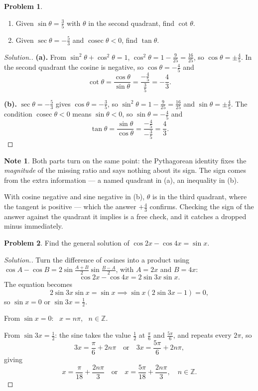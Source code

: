 \documentclass[11pt,a4paper]{article}
\theoremstyle{definition}
\newtheorem{note}[thm]{Note}
\newtheorem{problemx}{Problem}[section]
\newenvironment{problem}{\begin{problemx}}{\end{problemx}}
\newenvironment{solution}
  {\renewcommand{\qedsymbol}{}\begin{proof}[\textit{Solution}.]}
  {\end{proof}}
\begin{document}
\pagebreak

\begin{problem}
\begin{enumerate}
\item[(a).] Given $\sin\theta=\frac{3}{5}$ with $\theta$ in the second quadrant,
find $\cot\theta$.
\item[(b).] Given $\sec\theta=-\frac{5}{3}$ and $\operatorname{cosec}\theta<0$,
find $\tan\theta$.
\end{enumerate}
\end{problem}

\begin{solution}
\textbf{(a).} From $\sin^{2}\theta+\cos^{2}\theta=1$,
$\cos^{2}\theta=1-\frac{9}{25}=\frac{16}{25}$, so $\cos\theta=\pm\frac{4}{5}$. In
the second quadrant the cosine is negative, so $\cos\theta=-\frac{4}{5}$ and
$$\cot\theta=\frac{\cos\theta}{\sin\theta}
=\frac{-\frac{4}{5}}{\frac{3}{5}}=-\frac{4}{3}.$$

\textbf{(b).} $\sec\theta=-\frac{5}{3}$ gives $\cos\theta=-\frac{3}{5}$, so
$\sin^{2}\theta=1-\frac{9}{25}=\frac{16}{25}$ and $\sin\theta=\pm\frac{4}{5}$. The
condition $\operatorname{cosec}\theta<0$ means $\sin\theta<0$, so
$\sin\theta=-\frac{4}{5}$ and
$$\tan\theta=\frac{\sin\theta}{\cos\theta}
=\frac{-\frac{4}{5}}{-\frac{3}{5}}=\frac{4}{3}.$$
\end{solution}

\begin{note}
Both parts turn on the same point: the Pythagorean identity fixes the
\emph{magnitude} of the missing ratio and says nothing about its sign. The sign
comes from the extra information --- a named quadrant in (a), an inequality in (b).

With cosine negative and sine negative in (b), $\theta$ is in the third quadrant,
where the tangent is positive --- which the answer $+\frac{4}{3}$ confirms. Checking
the sign of the answer against the quadrant it implies is a free check, and it
catches a dropped minus immediately.
\end{note}

\pagebreak

\begin{problem}
Find the general solution of $\cos 2x-\cos 4x=\sin x$.
\end{problem}

\begin{solution}
Turn the difference of cosines into a product using
$\cos A-\cos B=2\sin\frac{A+B}{2}\sin\frac{B-A}{2}$, with $A=2x$ and $B=4x$:
$$\cos 2x-\cos 4x=2\sin 3x\sin x .$$
The equation becomes
$$2\sin 3x\sin x=\sin x
\implies \sin x\left(2\sin 3x-1\right)=0 ,$$
so $\sin x=0$ or $\sin 3x=\frac{1}{2}$.

From $\sin x=0$: \ $x=n\pi$, \ $n\in\mathbb{Z}$.

From $\sin 3x=\frac{1}{2}$: the sine takes the value $\frac{1}{2}$ at
$\frac{\pi}{6}$ and $\frac{5\pi}{6}$, and repeats every $2\pi$, so
$$3x=\frac{\pi}{6}+2n\pi \quad \text{or}\quad 
3x=\frac{5\pi}{6}+2n\pi ,$$
giving
$$x=\frac{\pi}{18}+\frac{2n\pi}{3} \quad \text{or}\quad 
x=\frac{5\pi}{18}+\frac{2n\pi}{3},\quad n\in\mathbb{Z}.$$
\end{solution}
\end{document}
